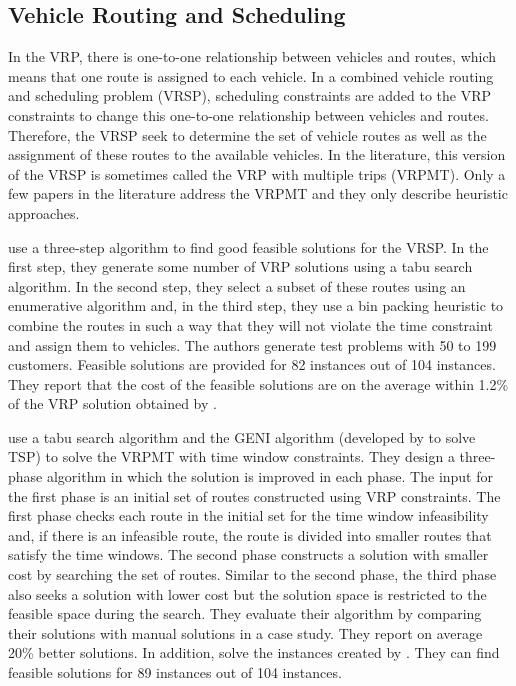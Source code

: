 \subsection{Vehicle Routing and Scheduling}
\label{lit-vrps}
In the VRP, there is one-to-one relationship between vehicles and routes, 
which means that one route is assigned to each vehicle. In a combined vehicle 
routing and scheduling problem (VRSP), scheduling constraints
are added to the VRP constraints to change this one-to-one relationship between 
vehicles and routes. Therefore, the VRSP seek to determine the set of vehicle 
routes as well as the assignment of these routes to the available vehicles. 
In the literature, this version of the VRSP is sometimes called the VRP with 
multiple trips (VRPMT). Only a few papers in the literature address the 
VRPMT and they only describe heuristic approaches.  

\citet{Taillard} use a three-step algorithm to find good feasible solutions 
for the VRSP. In the first step, they generate some number of VRP solutions 
using a tabu search algorithm. In the second step, they select a subset of 
these routes using an enumerative algorithm and, in the third step, they use 
a bin packing heuristic to combine the routes in such a way that they will 
not violate the time constraint and assign them to vehicles. The authors 
generate test problems with 50 to 199 customers. Feasible solutions are 
provided for 82 instances out of 104 instances. They report that the cost 
of the feasible solutions are on the average  within 1.2\%  of the VRP 
solution obtained by \citet{Rochat}.     

\citet{Brandao} use a tabu search algorithm and the GENI algorithm 
(developed by \citet{Gendreau} to solve TSP) to solve the VRPMT with time 
window constraints. They design a three-phase algorithm in which the 
solution is improved in each phase. The input for the first phase is an 
initial set of routes constructed using VRP constraints.
The first phase checks each route in the initial set for the time window 
infeasibility and, if there is an infeasible route, the route is divided 
into smaller routes that satisfy the time windows. The second phase 
constructs a solution with smaller cost by searching the set of routes. 
Similar to the second phase, the third phase also seeks a solution 
with lower cost but the solution space is restricted to the feasible 
space during the search. They evaluate their algorithm by comparing their 
solutions with manual solutions in a case study. They report on average 
20\% better solutions. In addition, \citet{Brandao2} solve the instances 
created by \citet{Taillard}. They can find feasible solutions for 89 
instances out of 104 instances.     

